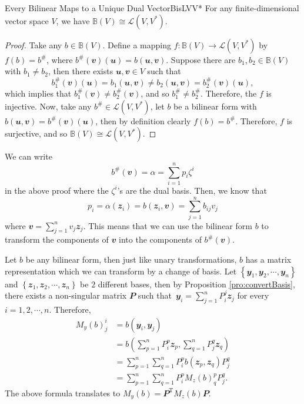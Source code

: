 \documentclass[math]{amznotes}
\theoremstyle{remark}
\begin{document}
\begin{probox}{Every Bilinear Maps to a Unique Dual Vector}{BisLVV*}
    For any finite-dimensional vector space $V$, we have $\mathbb{B}(V) \cong \mathcal{L}\left(V, V^*\right)$.
    \tcblower
    \begin{proof}
        Take any $b \in \mathbb{B}(V)$. Define a mapping $f \colon \mathbb{B}(V) \to  \mathcal{L}\left(V, V^*\right)$ by $f(b) = b^{\#}$, where $b^{\#}(\mathbfit{v})(\mathbfit{u}) = b(\mathbfit{u}, \mathbfit{v})$. Suppose there are $b_1, b_2 \in \mathbb{B}(V)$ with $b_1 \neq b_2$, then there exists $\mathbfit{u}, \mathbfit{v} \in V$ such that 
        \begin{equation*}
            b_1^{\#}(\mathbfit{v})(\mathbfit{u}) = b_1(\mathbfit{u}, \mathbfit{v}) \neq b_2(\mathbfit{u}, \mathbfit{v}) = b_2^{\#}(\mathbfit{v})(\mathbfit{u}),
        \end{equation*}
        which implies that $b_1^{\#}(\mathbfit{v}) \neq b_2^{\#}(\mathbfit{v})$, and so $b_1^{\#} \neq b_2^{\#}$. Therefore, the $f$ is injective. Now, take any $b^{\#} \in \mathcal{L}\left(V, V^*\right)$, let $b$ be a bilinear form with $b(\mathbfit{u}, \mathbfit{v}) = b^{\#}(\mathbfit{v})(\mathbfit{u})$, then by definition clearly $f(b) = b^{\#}$. Therefore, $f$ is surjective, and so $\mathbb{B}(V) \cong \mathcal{L}\left(V, V^*\right)$.
    \end{proof}
\end{probox}
We can write 
\begin{equation*}
    b^{\#}(\mathbfit{v}) = \alpha = \sum_{i = 1}^{n}p_i\zeta^i
\end{equation*}
in the above proof where the $\zeta^i$'s are the dual basis. Then, we know that 
\begin{equation*}
    p_i = \alpha\left(\mathbfit{z}_i\right) = b\left(\mathbfit{z}_i, \mathbfit{v}\right) = \sum_{j = 1}^{n}b_{ij}v_j
\end{equation*}
where $\mathbfit{v} = \sum_{j = 1}^{n}v_j\mathbfit{z}_j$. This means that we can use the bilinear form $b$ to transform the components of $\mathbfit{v}$ into the components of $b^{\#}(\mathbfit{v})$.

Let $b$ be any bilinear form, then just like unary transformations, $b$ has a matrix representation which we can transform by a change of basis. Let $\left\{\mathbfit{y}_1, \mathbfit{y}_2, \cdots, \mathbfit{y}_n\right\}$ and $\left\{\mathbfit{z}_1, \mathbfit{z}_2, \cdots, \mathbfit{z}_n\right\}$ be $2$ different bases, then by Proposition \ref{pro:convertBasis}, there exists a non-singular matrix $\mathbfit{P}$ such that~$\mathbfit{y}_i = \sum_{j = 1}^{n}P^j_i\mathbfit{z}_j$ for every $i = 1, 2, \cdots, n$. Therefore, 
\begin{align*}
    M_y(b)^i_j & = b\left(\mathbfit{y}_i, \mathbfit{y}_j\right) \\
    & = b\left(\sum_{p = 1}^{n}P^p_i\mathbfit{z}_p, \sum_{q = 1}^{n}P^q_j\mathbfit{z}_q\right) \\
    & = \sum_{p = 1}^{n}\sum_{q = 1}^{n}P^p_ib\left(\mathbfit{z}_p, \mathbfit{z}_q\right)P^q_j \\
    & = \sum_{p = 1}^{n}\sum_{q = 1}^{n}P^p_iM_z(b)^p_qP^q_j.
\end{align*}
The above formula translates to $M_y(b) = \mathbfit{P}^{\mathrm{T}}M_z(b)\mathbfit{P}$.
\end{document}
